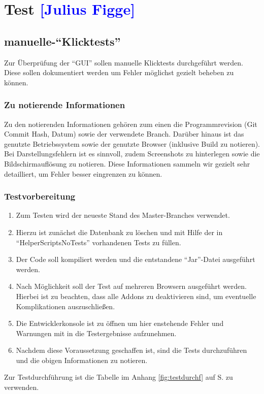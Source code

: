 

\section{Test \textcolor{blue}{[Julius Figge]}}

\subsection{manuelle-\enquote{Klicktests}}

Zur Überprüfung der \enquote{GUI} sollen manuelle Klicktests durchgeführt werden.
Diese sollen dokumentiert werden um Fehler möglichst gezielt beheben zu können.\\

\subsubsection*{Zu notierende Informationen}
Zu den notierenden Informationen gehören zum einen die Programmrevision (Git Commit Hash, Datum) sowie der verwendete Branch. Darüber hinaus ist das genutzte Betriebssystem sowie der genutzte Browser (inklusive Build zu notieren).
Bei Darstellungsfehlern ist es sinnvoll, zudem Screenshots zu hinterlegen sowie die Bildschirmauflösung zu notieren.
Diese Informationen sammeln wir gezielt sehr detailliert, um Fehler besser eingrenzen zu können.

\subsubsection*{Testvorbereitung}
\begin{enumerate}
    \item Zum Testen wird der neueste Stand des Master-Branches verwendet.
    \item Hierzu ist zunächst die Datenbank zu löschen und mit Hilfe der in \enquote{HelperScriptsNoTests}        vorhandenen Tests zu füllen.
    \item Der Code soll kompiliert werden und die entstandene \enquote{Jar}-Datei ausgeführt werden.
    \item Nach Möglichkeit soll der Test auf mehreren Browsern ausgeführt werden. Hierbei ist zu beachten, dass alle Addons zu deaktivieren sind, um eventuelle Komplikationen auszuschließen.
    \item Die Entwicklerkonsole ist zu öffnen um hier enstehende Fehler und Warnungen mit in die Testergebnisse aufzunehmen.
    \item Nachdem diese Voraussetzung geschaffen ist, sind die Tests durchzuführen und die obigen Informationen zu notieren.
\end{enumerate}

Zur Testdurchführung ist die Tabelle im Anhang \ref{fig:testdurchf} auf S.\pageref{fig:testdurchf} zu verwenden.

